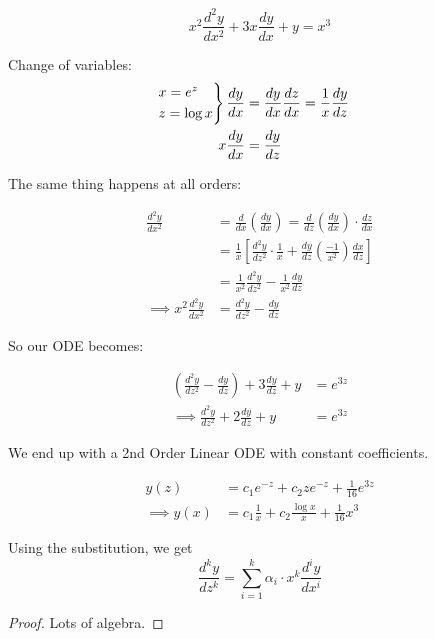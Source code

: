 \documentclass[10pt]{scrartcl}
\begin{document}
\begin{example}
\[x^2\frac{d^2y}{dx^2} + 3x\frac{dy}{dx} + y = x^3\]

Change of variables: 
\[\begin{aligned}
\begin{rcases*}
x = e^z\\
z = \log x	
\end{rcases*}
\frac{dy}{dx} &= \frac{dy}{dx}\frac{dz}{dx} = \frac{1}{x}\frac{dy}{dz}\\
x\frac{dy}{dx} &= \frac{dy}{dz}
\end{aligned}\]

The same thing happens at all orders: 

\[
\begin{aligned}
  \frac{d^2y}{dx^2} &= \frac{d}{dx}\left(\frac{dy}{dx}\right) = \frac{d}{dz}\left(\frac{dy}{dx}\right)\cdot\frac{dz}{dx}\\
  &= \frac{1}{x}\left[\frac{d^2y}{dz^2}\cdot\frac{1}{x} + \frac{dy}{dz}\left(\frac{-1}{x^2}\right)\frac{dx}{dz}\right]\\
  &= \frac{1}{x^2}\frac{d^2y}{dz^2} - \frac{1}{x^2}\frac{dy}{dz}\\
  \implies x^2\frac{d^2y}{dx^2} &= \frac{d^2y}{dz^2} - \frac{dy}{dz}
\end{aligned}
\]

So our ODE becomes:

\[
\begin{aligned}
  \left(\frac{d^2y}{dz^2} - \frac{dy}{dz}\right) + 3\frac{dy}{dz} + y &= e^{3z}\\
 \implies \frac{d^2y}{dz^2} + 2\frac{dy}{dz} + y &= e^{3z}
\end{aligned}
\]

We end up with a 2nd Order Linear ODE with constant coefficients. 

\[
\begin{aligned}
  y(z) &= c_1e^{-z} + c_2ze^{-z} + \frac{1}{16}e^{3z}\\
\implies  y(x) &= c_1\frac{1}{x} + c_2\frac{\log x}{x} + \frac{1}{16}x^3
\end{aligned}
\]
\end{example}
\pagebreak


\begin{theorem}
Using the substitution, we get
\[\frac{d^ky}{dz^k} = \sum_{i=1}^k\alpha_i\cdot x^k\frac{d^iy}{dx^i}\]	
\end{theorem}
\begin{proof}
Lots of algebra. 
\end{proof}
\end{document}
